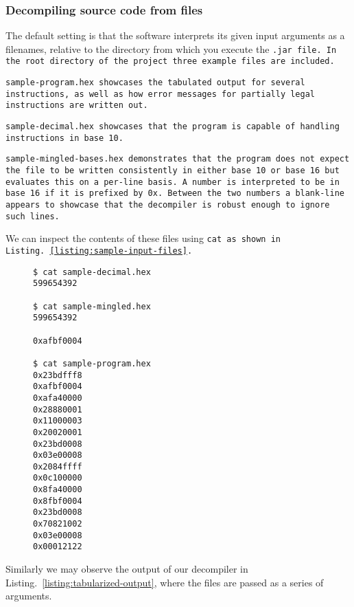 \subsubsection{Decompiling source code from files}

The default setting is that the software interprets its given input
arguments as a filenames, relative to the directory from which you
execute the \tt{.jar} file. In the root directory of the project three
example files are included.

\tt{sample-program.hex} showcases the tabulated output for several
instructions, as well as how error messages for partially legal
instructions are written out.

\tt{sample-decimal.hex} showcases that the program is capable
of handling instructions in base 10. 

\tt{sample-mingled-bases.hex} demonstrates that the program does not
expect the file to be written consistently in either base 10 or base
16 but evaluates this on a per-line basis. A number is interpreted to
be in base 16 if it is prefixed by \tt{0x}. Between the two numbers
a blank-line appears to showcase that the decompiler is robust
enough to ignore such lines.

We can inspect the contents of these files using \tt{cat}
as shown in Listing.~\ref{listing:sample-input-files}.

\begin{figure}
\begin{lstlisting}[style=plain,
    caption=Sample input files,
    label=listing:sample-input-files]
$ cat sample-decimal.hex 
599654392

$ cat sample-mingled.hex
599654392

0xafbf0004

$ cat sample-program.hex
0x23bdfff8
0xafbf0004
0xafa40000
0x28880001
0x11000003
0x20020001
0x23bd0008
0x03e00008
0x2084ffff
0x0c100000
0x8fa40000
0x8fbf0004
0x23bd0008
0x70821002
0x03e00008
0x00012122
\end{lstlisting}
\end{figure}

Similarly we may observe the output of our decompiler in
Listing.~\ref{listing:tabularized-output}, where the
files are passed as a series of arguments.

